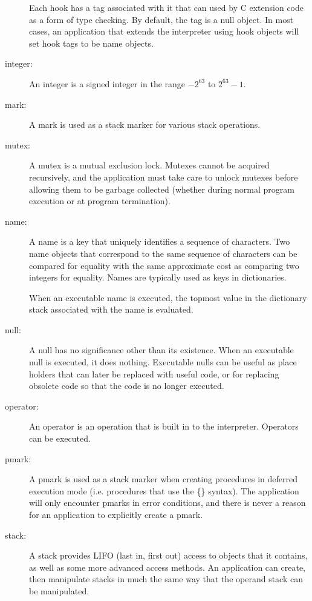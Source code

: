 \begin{description}
Each hook has a tag associated with it that can used by C extension code as a
form of type checking.  By default, the tag is a null object.  In most cases, an
application that extends the interpreter using hook objects will set hook tags
to be name objects.

\item[integer: ] An integer is a signed integer in the range $-2^{63}$ to
$2^{63} - 1$.

\item[mark: ] A mark is used as a stack marker for various stack operations.

\item[mutex: ] A mutex is a mutual exclusion lock.  Mutexes cannot be acquired
recursively, and the application must take care to unlock mutexes before
allowing them to be garbage collected (whether during normal program execution
or at program termination).

\item[name: ] A name is a key that uniquely identifies a sequence of characters.
Two name objects that correspond to the same sequence of characters can be
compared for equality with the same approximate cost as comparing two integers
for equality.  Names are typically used as keys in dictionaries.

When an executable name is executed, the topmost value in the dictionary stack
associated with the name is evaluated.

\item[null: ] A null has no significance other than its existence.  When an
executable null is executed, it does nothing.  Executable nulls can be useful as
place holders that can later be replaced with useful code, or for replacing
obsolete code so that the code is no longer executed.

\item[operator: ] An operator is an operation that is built in to the
interpreter.  Operators can be executed.

\item[pmark: ] A pmark is used as a stack marker when creating procedures in
deferred execution mode (i.e. procedures that use the \{\} syntax).  The
application will only encounter pmarks in error conditions, and there is never a
reason for an application to explicitly create a pmark.

\item[stack: ] A stack provides LIFO (last in, first out) access to objects that
it contains, as well as some more advanced access methods.  An application can
create, then manipulate stacks in much the same way that the operand stack can
be manipulated.


\end{description}
